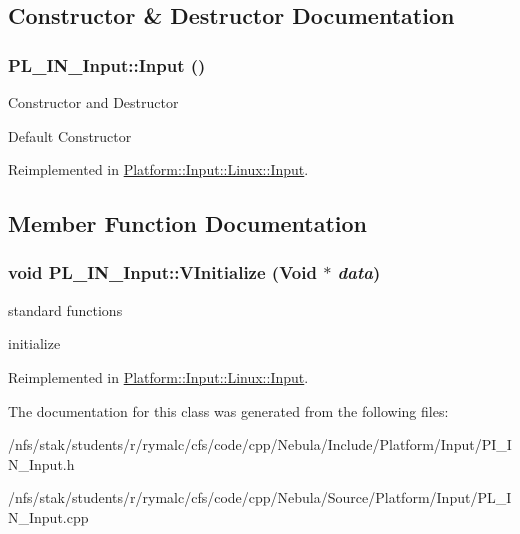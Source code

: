 \subsection{Constructor \& Destructor Documentation}
\hypertarget{classPlatform_1_1Input_1_1Input_afa32146b371e45509eef59474e6b0ef2}{
\subsubsection[{Input}]{\setlength{\rightskip}{0pt plus 5cm}PL\_\-IN\_\-Input::Input ()}}
\label{classPlatform_1_1Input_1_1Input_afa32146b371e45509eef59474e6b0ef2}
Constructor and Destructor

Default Constructor 

Reimplemented in \hyperlink{classPlatform_1_1Input_1_1Linux_1_1Input_a4d092b21c9937be42de3ec9b182959a8}{Platform::Input::Linux::Input}.

\subsection{Member Function Documentation}
\hypertarget{classPlatform_1_1Input_1_1Input_afd31cd2634d8f44441ac04fd2b2baf3a}{
\subsubsection[{VInitialize}]{\setlength{\rightskip}{0pt plus 5cm}void PL\_\-IN\_\-Input::VInitialize ({\bf Void} $\ast$ {\em data})}}
\label{classPlatform_1_1Input_1_1Input_afd31cd2634d8f44441ac04fd2b2baf3a}
standard functions

initialize 

Reimplemented in \hyperlink{classPlatform_1_1Input_1_1Linux_1_1Input_adfac30a8469aab931f5212c251104857}{Platform::Input::Linux::Input}.

The documentation for this class was generated from the following files:\begin{DoxyCompactItemize}
\item 
/nfs/stak/students/r/rymalc/cfs/code/cpp/Nebula/Include/Platform/Input/PI\_\-IN\_\-Input.h\item 
/nfs/stak/students/r/rymalc/cfs/code/cpp/Nebula/Source/Platform/Input/PL\_\-IN\_\-Input.cpp\end{DoxyCompactItemize}
